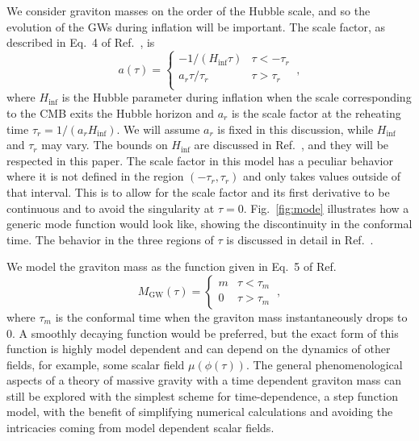\documentclass[prd,twocolumn,aps,psfig,nofootinbib,nobibnotes,superscriptaddress,preprintnumbers,times]{revtex4-2}
\begin{document}
We consider graviton masses on the order of the Hubble scale, and so the evolution of the GWs during inflation will be important.
The scale factor, as described in Eq.\ 4 of Ref.\ \cite{Fujita:2018ehq}, is
\begin{equation}\label{eqn:scale_fac}
    a(\tau) = 
    \begin{cases}
        -1/(H_{\inf}\tau) & \tau < -\tau_r \\
        a_r \tau/\tau_r & \tau > \tau_r \\
   \end{cases} \ ,
\end{equation}
where $H_{\inf}$ is the Hubble parameter during inflation when the scale corresponding to the CMB exits the Hubble horizon and $a_r$ is the scale factor at the reheating time $\tau_r = 1/(a_r H_{\inf})$. We will assume $a_r$ is fixed in this discussion, while $H_{\inf}$ and $\tau_r$ may vary. The bounds on $H_{\inf}$ are discussed in Ref.\ \cite{Jiang:2015qor}, and they will be respected in this paper. The scale factor in this model has a peculiar behavior where it is not defined in the region $(-\tau_r, \tau_r)$ and only takes values outside of that interval. This is to allow for the scale factor and its first derivative to be continuous and to avoid the singularity at $\tau = 0$. Fig.\ \ref{fig:mode} illustrates how a generic mode function would look like, showing the discontinuity in the conformal time. The behavior in the three regions of $\tau$ is discussed in detail in Ref.\ \cite{Fujita:2018ehq}.

We model the graviton mass as the function given in Eq.\ 5 of Ref.\ \cite{Fujita:2018ehq}
\begin{equation}\label{eqn:mass_case}
    M_\text{GW}(\tau) = 
    \begin{cases}
        m & \tau < \tau_m \\
        0 & \tau > \tau_m
   \end{cases} \ ,
\end{equation} 
where $\tau_m$ is the conformal time when the graviton mass instantaneously drops to 0. A smoothly decaying function would be preferred, but the exact form of this function is highly model dependent and can depend on the dynamics of other fields, for example, some scalar field $\mu(\phi(\tau))$. The general phenomenological aspects of a theory of massive gravity with a time dependent graviton mass can still be explored with the simplest scheme for time-dependence, a step function model, with the benefit of simplifying numerical calculations and avoiding the intricacies coming from model dependent scalar fields.
\end{document}
